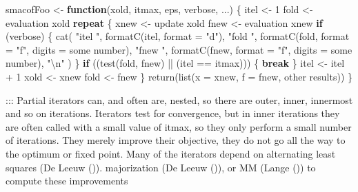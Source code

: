 \documentclass[
  12pt,
  letterpaper,
  DIV=11,
  numbers=noendperiod]{scrartcl}
\newenvironment{Shaded}{\begin{snugshade}}{\end{snugshade}}
\newcommand{\AttributeTok}[1]{\textcolor[rgb]{0.40,0.45,0.13}{#1}}
\newcommand{\ControlFlowTok}[1]{\textcolor[rgb]{0.00,0.23,0.31}{\textbf{#1}}}
\newcommand{\DecValTok}[1]{\textcolor[rgb]{0.68,0.00,0.00}{#1}}
\newcommand{\FunctionTok}[1]{\textcolor[rgb]{0.28,0.35,0.67}{#1}}
\newcommand{\NormalTok}[1]{\textcolor[rgb]{0.00,0.23,0.31}{#1}}
\newcommand{\OtherTok}[1]{\textcolor[rgb]{0.00,0.23,0.31}{#1}}
\newcommand{\SpecialCharTok}[1]{\textcolor[rgb]{0.37,0.37,0.37}{#1}}
\newcommand{\StringTok}[1]{\textcolor[rgb]{0.13,0.47,0.30}{#1}}
\theoremstyle{plain}
\theoremstyle{remark}
\begin{document}
\begin{Shaded}
\begin{Highlighting}[]
\NormalTok{smacofFoo }\OtherTok{\textless{}{-}} \ControlFlowTok{function}\NormalTok{(xold, itmax, eps, verbose, ...) \{}
\NormalTok{  itel }\OtherTok{\textless{}{-}} \DecValTok{1}
\NormalTok{  fold }\OtherTok{\textless{}{-}}\NormalTok{ evaluation xold}
  \ControlFlowTok{repeat}\NormalTok{ \{}
\NormalTok{    xnew }\OtherTok{\textless{}{-}}\NormalTok{ update xold}
\NormalTok{    fnew }\OtherTok{\textless{}{-}}\NormalTok{ evaluation xnew}
    \ControlFlowTok{if}\NormalTok{ (verbose) \{}
      \FunctionTok{cat}\NormalTok{(}
        \StringTok{"itel "}\NormalTok{,}
        \FunctionTok{formatC}\NormalTok{(itel, }\AttributeTok{format =} \StringTok{"d"}\NormalTok{),}
        \StringTok{"fold "}\NormalTok{,}
        \FunctionTok{formatC}\NormalTok{(fold, }\AttributeTok{format =} \StringTok{"f"}\NormalTok{, }\AttributeTok{digits =}\NormalTok{ some number),}
        \StringTok{"fnew "}\NormalTok{,}
        \FunctionTok{formatC}\NormalTok{(fnew, }\AttributeTok{format =} \StringTok{"f"}\NormalTok{, }\AttributeTok{digits =}\NormalTok{ some number),}
        \StringTok{"}\SpecialCharTok{\textbackslash{}n}\StringTok{"}
\NormalTok{      )}
\NormalTok{    \}}
    \ControlFlowTok{if}\NormalTok{ ((}\FunctionTok{test}\NormalTok{(fold, fnew) }\SpecialCharTok{||}\NormalTok{ (itel }\SpecialCharTok{==}\NormalTok{ itmax))) \{}
      \ControlFlowTok{break}
\NormalTok{    \}}
\NormalTok{    itel }\OtherTok{\textless{}{-}}\NormalTok{ itel }\SpecialCharTok{+} \DecValTok{1}
\NormalTok{    xold }\OtherTok{\textless{}{-}}\NormalTok{ xnew}
\NormalTok{    fold }\OtherTok{\textless{}{-}}\NormalTok{ fnew}
\NormalTok{  \}}
  \FunctionTok{return}\NormalTok{(}\FunctionTok{list}\NormalTok{(}\AttributeTok{x =}\NormalTok{ xnew, }\AttributeTok{f =}\NormalTok{ fnew, other results))}
\NormalTok{\}}
\end{Highlighting}
\end{Shaded}

::: Partial iterators can, and often are, nested, so there are outer,
inner, innermost and so on iterations. Iterators test for convergence,
but in inner iterations they are often called with a small value of
itmax, so they only perform a small number of iterations. They merely
improve their objective, they do not go all the way to the optimum or
fixed point. Many of the iterators depend on alternating least squares
(De Leeuw ()). majorization (De Leeuw
()), or MM (Lange
()) to compute these improvements
\end{document}

